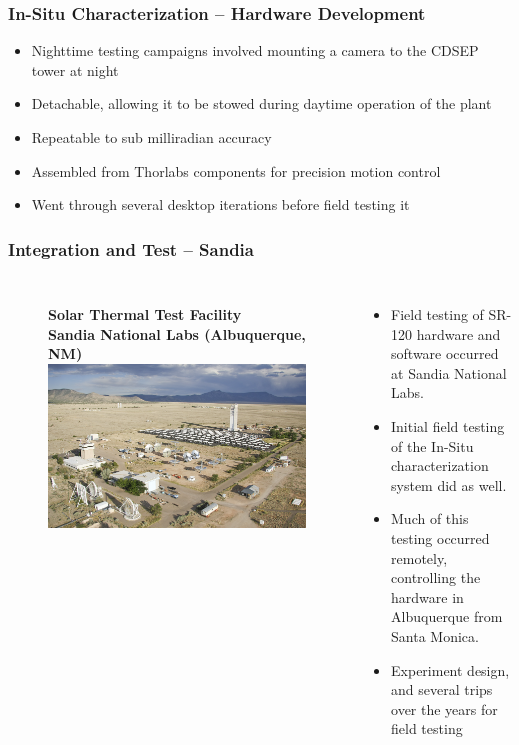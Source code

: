 \documentclass[aspectratio=169]{beamer}
\begin{document}
\begin{frame}
  \frametitle{In-Situ Characterization -- Hardware Development}
  \begin{itemize}
  \item Nighttime testing campaigns involved mounting a camera to the
    CDSEP tower at night
  \item Detachable, allowing it to be stowed during daytime operation of the plant
  \item Repeatable to sub milliradian accuracy
  \item Assembled from Thorlabs components for precision motion control
  \item Went through several desktop iterations before field testing it
  \end{itemize}
\end{frame}

\begin{frame}
  \frametitle{Integration and Test -- Sandia}
  \begin{columns}[c]
    \begin{figure}
      \textbf{Solar Thermal Test Facility\\Sandia National Labs
        (Albuquerque, NM)}
      \includegraphics[width=\linewidth]{Sandia.png}
    \end{figure}

    \begin{itemize}
    \item Field testing of SR-120 hardware and software occurred at
      Sandia National Labs.
    \item Initial field testing of the In-Situ characterization system did as well.
    \item Much of this testing occurred remotely, controlling the hardware in Albuquerque from Santa Monica.
    \item Experiment design, and several trips over the years for field testing
    \end{itemize}
  \end{columns}
\end{frame}
\end{document}
